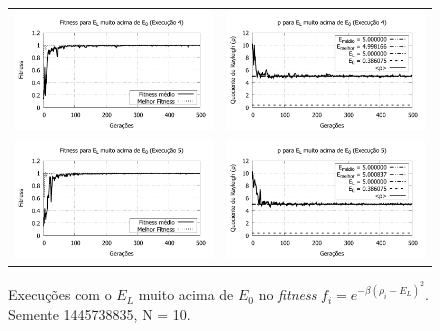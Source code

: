 \begin{figure}[p]
\begin{tabular}{@{}cc@{}}
		\includegraphics[width=.40\textwidth]{figs/resultados/variandoEL/T3E4_fitness.pdf} &
    \includegraphics[width=.40\textwidth]{figs/resultados/variandoEL/T3E4_rho.pdf}   \\
		
		\includegraphics[width=.40\textwidth]{figs/resultados/variandoEL/T3E5_fitness.pdf} &
    \includegraphics[width=.40\textwidth]{figs/resultados/variandoEL/T3E5_rho.pdf}
		
  \end{tabular}
  \caption{Execuções com o $E_L$ muito acima de $E_0$ no \textit{fitness} $f_i = e^{-\beta(\rho_i - E_L)^2}$. Semente 1445738835, N = 10.}
	\label{fig:variando_EL_muito_acima}
	\end{figure}

